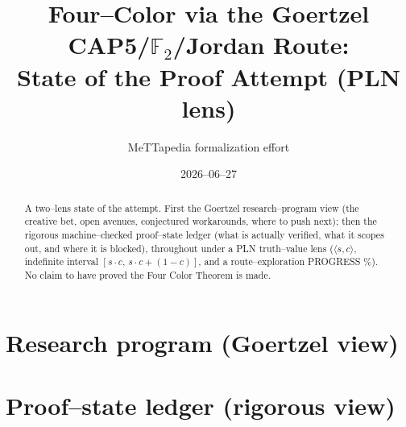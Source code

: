 \documentclass[11pt]{report}
\title{Four--Color via the Goertzel CAP5/$\mathbb{F}_2$/Jordan Route:\\ State of the Proof Attempt (PLN lens)}
\author{MeTTapedia formalization effort}
\date{2026--06--27}
\begin{document}
\maketitle
\begin{abstract}
A two--lens state of the attempt. First the Goertzel research--program view (the
creative bet, open avenues, conjectured workarounds, where to push next); then the
rigorous machine--checked proof--state ledger (what is actually verified, what it
scopes out, and where it is blocked), throughout under a PLN truth--value lens
($\langle s,c\rangle$, indefinite interval $[s\cdot c,\,s\cdot c+(1-c)]$, and a
route--exploration PROGRESS \%). No claim to have proved the Four Color Theorem is made.
\end{abstract}
\chapter{Research program (Goertzel view)}

\chapter{Proof--state ledger (rigorous view)}

\end{document}
